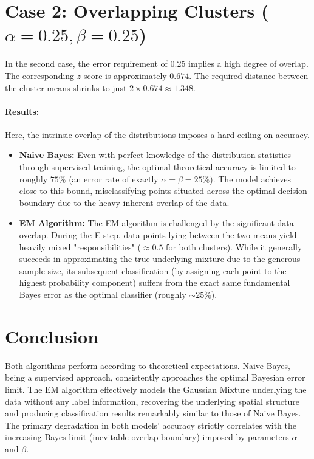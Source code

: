 \documentclass{article}
\begin{document}
\section{Case 2: Overlapping Clusters ($\alpha = 0.25, \beta = 0.25$)}
In the second case, the error requirement of 0.25 implies a high degree of overlap. The corresponding $z$-score is approximately $0.674$. The required distance between the cluster means shrinks to just $2 \times 0.674 \approx 1.348$.

\paragraph{Results:}
Here, the intrinsic overlap of the distributions imposes a hard ceiling on accuracy.
\begin{itemize}
    \item \textbf{Naive Bayes:} Even with perfect knowledge of the distribution statistics through supervised training, the optimal theoretical accuracy is limited to roughly $75\%$ (an error rate of exactly $\alpha = \beta = 25\%$). The model achieves close to this bound, misclassifying points situated across the optimal decision boundary due to the heavy inherent overlap of the data.
    \item \textbf{EM Algorithm:} The EM algorithm is challenged by the significant data overlap. During the E-step, data points lying between the two means yield heavily mixed "responsibilities" ($\approx 0.5$ for both clusters). While it generally succeeds in approximating the true underlying mixture due to the generous sample size, its subsequent classification (by assigning each point to the highest probability component) suffers from the exact same fundamental Bayes error as the optimal classifier (roughly $\sim 25\%$).
\end{itemize}

\section{Conclusion}
Both algorithms perform according to theoretical expectations. Naive Bayes, being a supervised approach, consistently approaches the optimal Bayesian error limit. The EM algorithm effectively models the Gaussian Mixture underlying the data without any label information, recovering the underlying spatial structure and producing classification results remarkably similar to those of Naive Bayes. The primary degradation in both models' accuracy strictly correlates with the increasing Bayes limit (inevitable overlap boundary) imposed by parameters $\alpha$ and $\beta$.
\end{document}
